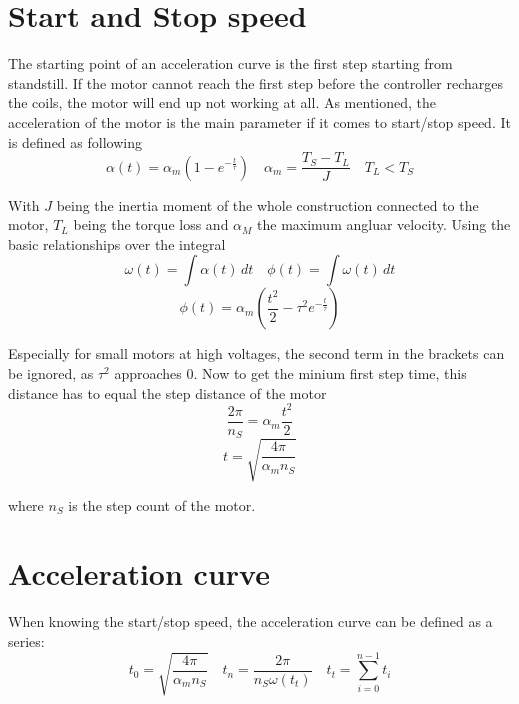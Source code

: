 \documentclass{article}
\begin{document}
\section{Start and Stop speed}

    The starting point of an acceleration curve is the first step starting from standstill. If the motor cannot reach the first step before the controller recharges the coils, 
    the motor will end up not working at all. As mentioned, the acceleration of the motor is the main parameter if it comes to start/stop speed. It is defined as following
    \begin{equation}
        \alpha(t) = \alpha_m (1 - e^{-\frac{t}{\tau}}) \quad \alpha_m = \frac{T_S - T_L}{J} \quad T_L < T_S
    \end{equation}

    With $J$ being the inertia moment of the whole construction connected to the motor, $T_L$ being the torque loss and $\alpha_M$ the maximum angluar velocity.
    Using the basic relationships over the integral
    \[
        \omega(t) = \int \alpha(t) \, dt \quad \phi(t) = \int \omega(t) \, dt
    \]
    \begin{equation}
        \phi(t) = \alpha_m (\frac{t^2}{2} - \tau^2 e^{-\frac{t}{\tau}})
    \end{equation}

    Especially for small motors at high voltages, the second term in the brackets can be ignored, as $\tau^2$ approaches 0. Now to get the minium first step time, this distance has to equal the step distance of the motor
    \[
        \frac{2\pi}{n_S} = \alpha_m \frac{t^2}{2}
    \]
    \begin{equation}
        t = \sqrt{\frac{4\pi}{\alpha_m n_S}}
    \end{equation}

    where $n_S$ is the step count of the motor.

\section{Acceleration curve}

    When knowing the start/stop speed, the acceleration curve can be defined as a series:
    \begin{equation}
        t_0 = \sqrt{\frac{4\pi}{\alpha_m n_S}} \quad
        t_{n} = \frac{2\pi}{n_S\omega(t_t)} \quad t_t = \sum_{i = 0}^{n - 1}{t_i}
    \end{equation}
    
\end{document}

